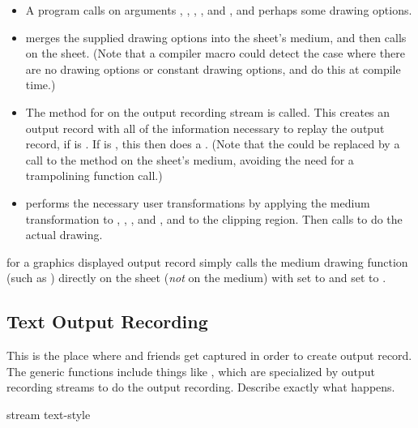 \begin{itemize}
\item A program calls  on arguments , ,
, , and , and perhaps some drawing options.

\item {} merges the supplied drawing options into the sheet's
medium, and then calls  on the sheet.  (Note that a
compiler macro could detect the case where there are no drawing options or
constant drawing options, and do this at compile time.)

\item The  method for  on the output recording
stream is called.  This creates an output record with all of the information
necessary to replay the output record, if  is
.  If  is , this then does a
.  (Note that the  could be replaced
by a call to the  method on the sheet's medium, avoiding
the need for a trampolining function call.)

\item {} performs the necessary user transformations by
applying the medium transformation to , , , and
, and to the clipping region.  Then  calls
 to do the actual drawing.
\end{itemize}

 for a graphics displayed output record simply calls
the medium drawing function (such as ) directly on the
sheet ({\sl not} on the medium) with  set to 
and  set to .


\subsection {Text Output Recording}

 {This is the place where  and friends get captured
in order to create output record.  The generic functions include things like
, which are specialized by output recording streams to
do the output recording.  Describe exactly what happens.}

 {stream text-style}

